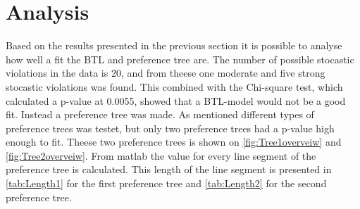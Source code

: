 \section*{Analysis}
\label{Analyse}
%
Based on the results presented in the previous section it is possible to analyse how well a fit the BTL and preference tree are.\blankline
%
The number of possible stocastic violations in the data is 20, and from theese one moderate and five strong stocastic violations was found. This combined with the Chi-square test, which calculated a p-value at 0.0055, showed that a BTL-model would not be a good fit. Instead a preference tree was made.\blankline
%
As mentioned different types of preference trees was testet, but only two preference trees had a p-value high enough to fit. Theese two preference trees is shown on \autoref{fig:Tree1overveiw} and \autoref{fig:Tree2overveiw}. From matlab the value for every line segment of the preference tree is calculated. This length of the line segment is presented in \autoref{tab:Length1} for the first preference tree and \autoref{tab:Length2} for the second preference tree.  


